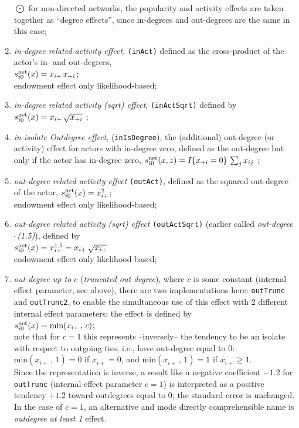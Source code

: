\documentclass[a4paper,fleqn,11pt]{article}
\newcommand{\+}{\, + \,}
\newcommand{\vit}{\theenumi}
\begin{document}
\begin{enumerate}
 \item[{\hspace*{-1ex}$\bigodot$}] for non-directed networks, the popularity and activity
 effects are taken together as ``degree effects'',
 since in-degrees and out-degrees are the same in this case;

 \item {\em in-degree related activity effect}, \texttt{(inAct)}
 defined as  the cross-product  of the actor's in- and out-degrees,\\
 $s^{\rm net}_{i\vit}(x) = x_{i+}\, x_{+i}$;\\
 endowment effect only likelihood-based;

 \item {\em in-degree related activity (sqrt) effect}, \texttt{(inActSqrt)}
 defined by  \\
 $s^{\rm net}_{i\vit}(x) = x_{i+}\,\sqrt{x_{+i}}$ ;

\item \emph{in-isolate Outdegree effect}, (\texttt{inIsDegree}), the
      (additional) out-degree (or activity)
      effect for actors with in-degree zero, defined as the out-degree
      but only if the actor has in-degree zero,
 $s^{\rm net}_{i\vit}(x, z) =   I\{x_{+i} = 0 \}\, \sum_j x_{ij}   $ ;\\

 \item {\em out-degree related activity effect} \texttt{(outAct)},
 	 defined as the squared out-degree of the actor,
 $s^{\rm net}_{i\vit}(x) = x^2_{i+}$;\\
 endowment effect only likelihood-based;

 \item {\em out-degree related activity (sqrt) effect}  \texttt{(outActSqrt)}
 (earlier called {\em out-degree$\,\hat{\ }$(1.5)}), defined by  \\
 $s^{\rm net}_{i\vit}(x) = x^{1.5}_{i+} = x_{i+}\,\sqrt{x_{i+}}$ \\
 endowment effect only likelihood-based;

 \item {\em out-degree up to $c$} (\emph{truncated out-degree}),
 where $c$ is some constant
 (internal effect parameter, see above),  there are two implementations here:
 \texttt{outTrunc} and \texttt{outTrunc2}, to enable the simultaneous use of this
 effect with 2 different internal effect parameters; the effect is
 defined by  \\
 $s^{\rm net}_{i\vit}(x) = \text{min}(x_{i+}\,,\, c)$;\\
 note that for $c=1$ this represents --inversely-- the tendency to be an isolate
 with respect to outgoing ties, i.e., have out-degree equal to 0:
 $ \text{min}(x_{i+}\,,\, 1) = 0$ if $x_{i+} = 0$, and
 $ \text{min}(x_{i+}\,,\, 1) = 1$ if $x_{i+} \geq 1$.\\
 Since the representation is inverse, a result like a negative coefficient
 $ -1.2$ for \texttt{outTrunc} (internal effect parameter $c=1$) is interpreted
 as a positive tendency $+1.2$ toward outdegrees equal to 0; the standard
 error is unchanged. In the case of $c=1$, an alternative and mode directly
 comprehensible name is \emph{outdegree at least 1} effect.


\end{enumerate}
\end{document}
